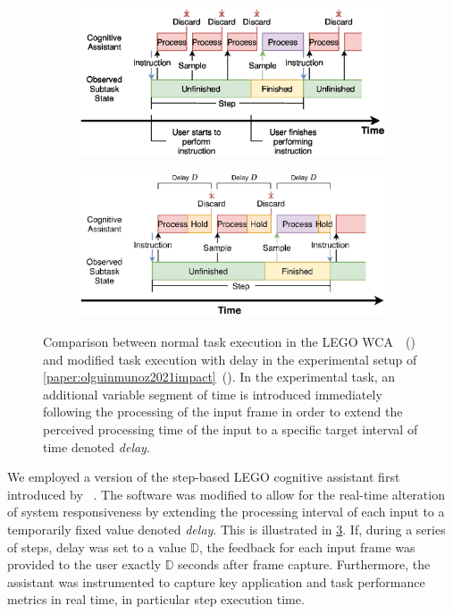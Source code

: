 \begin{figure}[tb]
    \centering
    \begin{subfigure}[t]{.49\textwidth}
        \centering
        \includegraphics[width=\textwidth]{publications/2021ImpactDelayedResponse/Fig4a}
        \caption{}\label{sfig:regularwcaexec}
    \end{subfigure}%
    \hfill%
    \begin{subfigure}[t]{.49\textwidth}
        \centering
        \includegraphics[width=\textwidth]{publications/2021ImpactDelayedResponse/Fig4b}
        \caption{}\label{sfig:delaywcaexec}
    \end{subfigure}
    \caption{%
        Comparison between normal task execution in the LEGO \ac{WCA}~\cite{chen2015early}~() and modified task execution with delay in the experimental setup of \cref{paper:olguinmunoz2021impact}~().
        In the experimental task, an additional variable segment of time is introduced immediately following the processing of the input frame in order to extend the perceived processing time of the input to a specific target interval of time denoted \emph{delay}.
    }\label{fig:regularwca-vs-delaywca}
\end{figure}

We employed a version of the step-based LEGO cognitive assistant first introduced by \citeauthor{chen2015early}~\cite{chen2015early}.
The software was modified to allow for the real-time alteration of system responsiveness by extending the processing interval of each input to a temporarily fixed value denoted \emph{delay}.
This is illustrated in \cref{fig:regularwca-vs-delaywca}.
If, during a series of steps, delay was set to a value \ensuremath{\mathbb{D}}, the feedback for each input frame was provided to the user exactly \ensuremath{\mathbb{D}} seconds after frame capture.
Furthermore, the assistant was instrumented to capture key application and task performance metrics in real time, in particular step execution time.

